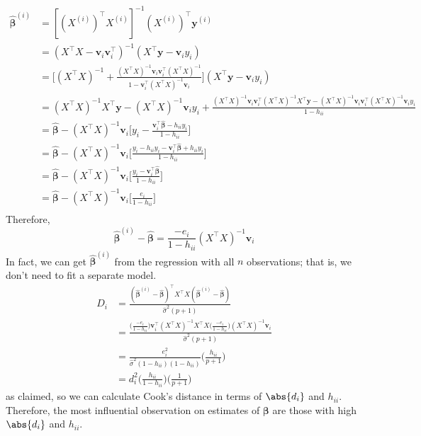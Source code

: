 \begin{align*}
    \hat{\symbf{\beta}}^{(i)}
     & =[(X^{(i)})^\top
    X^{(i)}]^{-1}(X^{(i)})^\top \symbf{y}^{(i)}                                                  \\
     & =(X^\top X-\symbf{v}_i\symbf{v}_i^\top)^{-1}(X^\top \symbf{y}-
    \symbf{v}_i y_i)                                                                             \\
     & =\biggl[(X^\top X)^{-1}+\frac{(X^\top X)^{-1}\symbf{v}_i\symbf{v}_i^\top
            (X^\top X)^{-1}}{1-\symbf{v}_i^\top (X^\top X)^{-1}\symbf{v}_i} \biggr]
    (X^\top \symbf{y}-\symbf{v}_i y_i)                                                           \\
     & =(X^\top X)^{-1}X^\top\symbf{y}-(X^\top X)^{-1}\symbf{v}_i y_i+
    \frac{(X^\top X)^{-1}\symbf{v}_i\symbf{v}_i^\top (X^\top X)^{-1}X^\top\symbf{y}
    -(X^\top X)^{-1}\symbf{v}_i\symbf{v}_i^\top(X^\top X)^{-1}\symbf{v}_i y_i
    }{1-h_{ii}}                                                                                  \\
     & =\hat{\symbf{\beta}}-(X^\top X)^{-1}\symbf{v}_i
    \biggl[y_i-\frac{\symbf{v}_i^\top\hat{\symbf{\beta}}-h_{ii}y_i}{1-h_{ii}} \biggr]            \\
     & =\hat{\symbf{\beta}}-(X^\top X)^{-1}\symbf{v}_i
    \biggl[\frac{y_i-h_{ii}y_i-\symbf{v}_i^\top \hat{\symbf{\beta}}+h_{ii}y_i}{1-h_{ii}} \biggr] \\
     & =\hat{\symbf{\beta}}-(X^\top X)^{-1}\symbf{v}_i
    \biggl[\frac{y_i-\symbf{v}_i^\top \hat{\symbf{\beta}}}{1-h_{ii}} \biggr]                     \\
     & =\hat{\symbf{\beta}}-(X^\top X)^{-1}\symbf{v}_i
    \biggl[\frac{e_i}{1-h_{ii}} \biggr]                                                          \\
\end{align*}
Therefore,
\[ \hat{\symbf{\beta}}^{(i)}-\hat{\symbf{\beta}}=
    \frac{-e_i}{1-h_{ii}}(X^\top X)^{-1}\symbf{v}_i  \]
In fact, we can get $  \hat{\symbf{\beta}}^{(i)} $
from the regression with all $ n $ observations;
that is, we don't need to fit a separate model.
\begin{align*}
    D_i
     & =\frac{(\hat{\symbf{\beta}}^{(i)}-\hat{\symbf{\beta}})^{\top}
        X^\top X(\hat{\symbf{\beta}}^{(i)}-\hat{\symbf{\beta}})}{
    \hat{\sigma}^2(p+1) }                                            \\
     & =\frac{\displaystyle \biggl(\frac{-e_i}{1-h_{ii}} \biggr)
        \symbf{v}_i^\top (X^\top X)^{-1}X^\top X
        \biggl(\frac{-e_i}{1-h_{ii}} \biggr)(X^\top X)^{-1}\symbf{v}_i}{
        \hat{\sigma}^2(p+1)
    }                                                                \\
     & =\frac{e_i^2}{\hat{\sigma}^2(1-h_{ii})(1-h_{ii})}
    \biggl(\frac{h_{ii}}{p+1} \biggr)                                \\
     & =d_i^2\biggl(\frac{h_{ii}}{1-h_{ii}} \biggr)
    \biggl(\frac{1}{p+1} \biggr)
\end{align*}
as claimed, so we can calculate Cook's distance in terms of
$ \abs{d_i} $ and $ h_{ii} $. Therefore, the most influential
observation on estimates of $ \symbf{\beta} $
are those with high $ \abs{d_i} $ and $ h_{ii} $.

